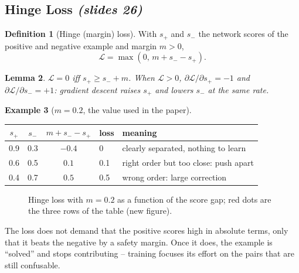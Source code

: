 \documentclass[11pt,a4paper]{article}
\newcommand{\slr}[1]{\texorpdfstring{\emph{(slides #1)}}{(slides #1)}}
\theoremstyle{definition}
\newtheorem{definition}{Definition}[section]
\newtheorem{example}[definition]{Example}
\theoremstyle{plain}
\newtheorem{lemma}[definition]{Lemma}
\theoremstyle{remark}
\begin{document}
\subsection{Hinge Loss \slr{26}}
\begin{definition}[Hinge (margin) loss]
With $s_+$ and $s_-$ the network scores of the positive and negative example and margin $m>0$,
\[ \mathcal L=\max(0,\,m+s_--s_+). \]
\end{definition}
\begin{lemma}
$\mathcal L=0$ iff $s_+\ge s_-+m$. When $\mathcal L>0$, $\partial\mathcal L/\partial s_+=-1$ and $\partial\mathcal L/\partial s_-=+1$: gradient descent raises $s_+$ and lowers $s_-$ at the same rate.
\end{lemma}
\begin{example}[$m=0.2$, the value used in the paper]
\begin{center}\small
\begin{tabular}{@{}cccll@{}}\toprule
$s_+$ & $s_-$ & $m+s_--s_+$ & loss & meaning\\\midrule
0.9 & 0.3 & $-0.4$ & 0 & clearly separated, nothing to learn\\
0.6 & 0.5 & $0.1$ & 0.1 & right order but too close: push apart\\
0.4 & 0.7 & $0.5$ & 0.5 & wrong order: large correction\\\bottomrule
\end{tabular}
\end{center}
\end{example}
\begin{figure}[H]\centering
{}
\caption{Hinge loss with $m=0.2$ as a function of the score gap; red dots are the three rows of the table (new figure).}
\end{figure}
\begin{intuition}
The loss does not demand that the positive scores high in absolute terms, only that it beats the negative by a safety margin. Once it does, the example is ``solved'' and stops contributing -- training focuses its effort on the pairs that are still confusable.
\end{intuition}
\end{document}
